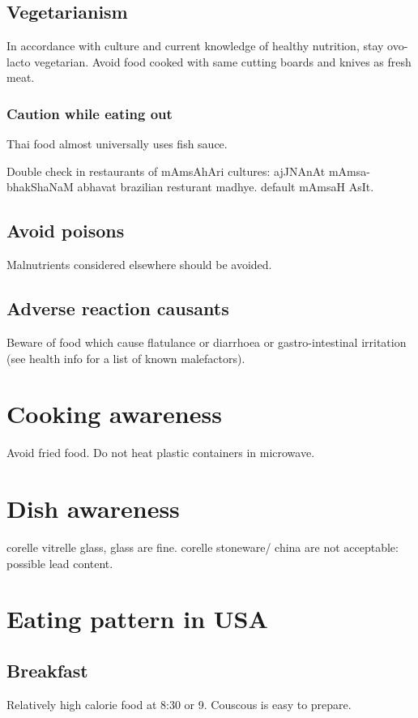 \documentclass[oneside, article]{memoir}
\begin{document}
\subsection{Vegetarianism}
In accordance with culture and current knowledge of healthy nutrition, stay ovo-lacto vegetarian. Avoid food cooked with same cutting boards and knives as fresh meat.

\subsubsection{Caution while eating out}
Thai food almost universally uses fish sauce.

Double check in restaurants of mAmsAhAri cultures: ajJNAnAt mAmsa-bhakShaNaM abhavat brazilian resturant madhye. default mAmsaH AsIt.

\subsection{Avoid poisons}
Malnutrients considered elsewhere should be avoided.

\subsection{Adverse reaction causants}
Beware of food which cause flatulance or diarrhoea or gastro-intestinal irritation (see health info for a list of known malefactors).

\section{Cooking awareness}
Avoid fried food. Do not heat plastic containers in microwave.

\section{Dish awareness}
corelle vitrelle glass, glass are fine. corelle stoneware/ china are not acceptable: possible lead content.

\section{Eating pattern in USA}
\subsection{Breakfast}
Relatively high calorie food at 8:30 or 9. Couscous is easy to prepare.
\end{document}
